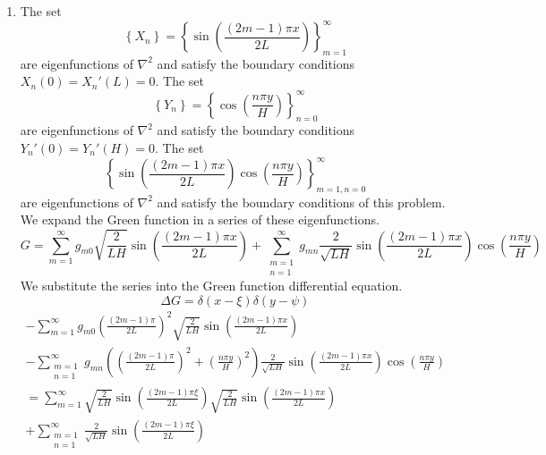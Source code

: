 {%
\begin{Solution}
  \begin{enumerate}
  \item
    The set 
    \[
    \left\{ X_n \right\} = \left\{ 
      \sin \left( \frac{(2m-1) \pi x}{2 L} \right) \right\}_{m=1}^\infty
    \]
    are eigenfunctions of $\nabla^2$ and satisfy the boundary conditions
    $X_n(0) = X_n'(L) = 0$.  The set
    \[
    \left\{ Y_n \right\} = \left\{ 
      \cos \left( \frac{n \pi y}{H} \right) \right\}_{n=0}^\infty
    \]
    are eigenfunctions of $\nabla^2$ and satisfy the boundary conditions
    $Y_n'(0) = Y_n'(H) = 0$.  The set
    \[
    \left\{ \sin \left( \frac{(2m-1) \pi x}{2 L} \right) 
      \cos \left( \frac{n \pi y}{H} \right) 
    \right\}_{m=1,n=0}^\infty
    \]
    are eigenfunctions of $\nabla^2$ and satisfy the boundary conditions
    of this problem.  We expand the Green function in a series of these 
    eigenfunctions.
    \[
    G = \sum_{m = 1}^\infty g_{m0} \sqrt{ \frac{2}{L H} } \sin \left(
      \frac{ (2m-1) \pi x }{ 2 L } \right)
    + \sum_{\substack{m=1\\n=1}}^\infty g_{m n} 
    \frac{2}{\sqrt{L H}} \sin \left( \frac{ (2m-1) \pi x }{ 2 L } \right)
    \cos \left( \frac{ n \pi y }{ H } \right)
    \]
    We substitute the series into the Green function differential
    equation.
    \[
    \Delta G = \delta(x - \xi) \delta(y - \psi)
    \]
    \begin{multline*}
      - \sum_{m = 1}^\infty g_{m0} \left( \frac{ (2m-1) \pi }{ 2 L } \right)^2
      \sqrt{ \frac{2}{L H} } \sin \left(
        \frac{ (2m-1) \pi x }{ 2 L } \right) 
      \\
      - \sum_{\substack{m=1\\n=1}}^\infty g_{m n} 
      \left( \left( \frac{ (2m-1) \pi }{ 2 L } \right)^2
        + \left( \frac{ n \pi y }{ H } \right)^2 \right)
      \frac{2}{\sqrt{L H}} \sin \left( \frac{ (2m-1) \pi x }{ 2 L } \right)
      \cos \left( \frac{ n \pi y }{ H } \right) 
      \\
      = \sum_{m = 1}^\infty \sqrt{ \frac{2}{L H} } \sin \left(
        \frac{ (2m-1) \pi \xi }{ 2 L } \right)
      \sqrt{ \frac{2}{L H} } \sin \left(
        \frac{ (2m-1) \pi x }{ 2 L } \right) 
      \\
      + \sum_{\substack{m=1\\n=1}}^\infty 
      \frac{2}{\sqrt{L H}} \sin \left( \frac{ (2m-1) \pi \xi }{ 2 L } \right)

\end{multline*}
\end{enumerate}
\end{Solution}}
